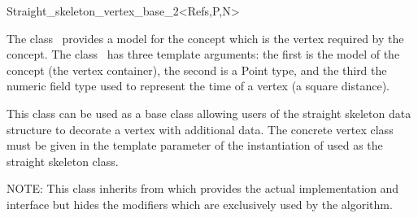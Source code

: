 

\begin{ccRefClass}{Straight_skeleton_vertex_base_2<Refs,P,N>}


\ccDefinition

The class \ccRefName\ provides a model for the
 concept which is the vertex
required by the 
concept. The class \ccRefName\ has three template arguments: the first is 
the model of the  concept (the vertex container), the second is a Point type, and the third the numeric field type used to represent the time of a vertex (a square distance).

This class can be used as a base class allowing users of the straight skeleton data structure to decorate a vertex with additional data. The concrete vertex class must be given in the  template parameter of the instantiation of  used as the straight skeleton class.

NOTE: This class inherits from  which provides the actual implementation and interface but hides the modifiers which are exclusively used by the algorithm.


\ccIsModel
{}\\
\\
\\
\\

\ccSeeAlso
{}\\
\\
\\
\\
\end{ccRefClass}


